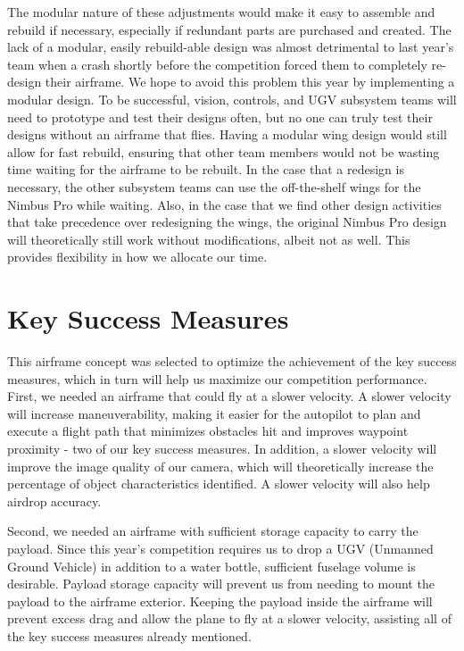 \documentclass[]{auvsi_doc}
\begin{document}
The modular nature of these adjustments would make it easy to assemble and rebuild if necessary, especially if redundant parts are purchased and created. The lack of a modular, easily rebuild-able design was almost detrimental to last year's team when a crash shortly before the competition forced them to completely re-design their airframe. We hope to avoid this problem this year by implementing a modular design. To be successful, vision, controls, and UGV subsystem teams will need to prototype and test their designs often, but no one can truly test their designs without an airframe that flies. Having a modular wing design would still allow for fast rebuild, ensuring that other team members would not be wasting time waiting for the airframe to be rebuilt. In the case that a redesign is necessary, the other subsystem teams can use the off-the-shelf wings for the Nimbus Pro while waiting. Also, in the case that we find other design activities that take precedence over redesigning the wings, the original Nimbus Pro design will theoretically still work without modifications, albeit not as well. This provides flexibility in how we allocate our time.

\section{Key Success Measures}

This airframe concept was selected to optimize the achievement of the key success measures, which in turn will help us maximize our competition performance. First, we needed an airframe that could fly at a slower velocity. A slower velocity will increase maneuverability, making it easier for the autopilot to plan and execute a flight path that minimizes obstacles hit and improves waypoint proximity - two of our key success measures. In addition, a slower velocity will improve the image quality of our camera, which will theoretically increase the percentage of object characteristics identified. A slower velocity will also help airdrop accuracy. 

Second, we needed an airframe with sufficient storage capacity to carry the payload. Since this year's competition requires us to drop a UGV (Unmanned Ground Vehicle) in addition to a water bottle, sufficient fuselage volume is desirable. Payload storage capacity will prevent us from needing to mount the payload to the airframe exterior. Keeping the payload inside the airframe will prevent excess drag and allow the plane to fly at a slower velocity, assisting all of the key success measures already mentioned.
\end{document}
